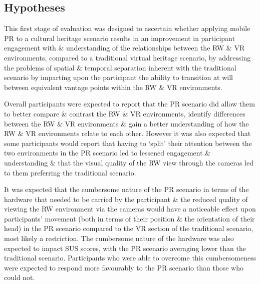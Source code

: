 	
	
	
	


\subsection{Hypotheses}
\label{stage1hypotheses}
This first stage of evaluation was designed to ascertain whether applying mobile PR to a cultural heritage scenario results in an improvement in participant engagement with \& understanding of the relationships between the RW \& VR environments, compared to a traditional virtual heritage scenario, by addressing the problems of spatial \& temporal separation inherent with the traditional scenario by imparting upon the participant the ability to transition at will between equivalent vantage points within the RW \& VR environments.

Overall participants were expected to report that the PR scenario did allow them to better compare \& contrast the RW \& VR environments, identify differences between the RW \& VR environments \& gain a better understanding of how the RW \& VR environments relate to each other. However it was also expected that some participants would report that having to `split' their attention between the two environments in the PR scenario led to lessened engagement \& understanding \& that the visual quality of the RW view through the cameras led to them preferring the traditional scenario.

It was expected that the cumbersome nature of the PR scenario in terms of the hardware that needed to be carried by the participant \& the reduced quality of viewing the RW environment via the cameras would have a noticeable effect upon participants' movement (both in terms of their position \& the orientation of their head) in the PR scenario compared to the VR section of the traditional scenario, most likely a restriction. The cumbersome nature of the hardware was also expected to impact SUS scores, with the PR scenario averaging lower than the traditional scenario. Participants who were able to overcome this cumbersomeness were expected to respond more favourably to the PR scenario than those who could not.

